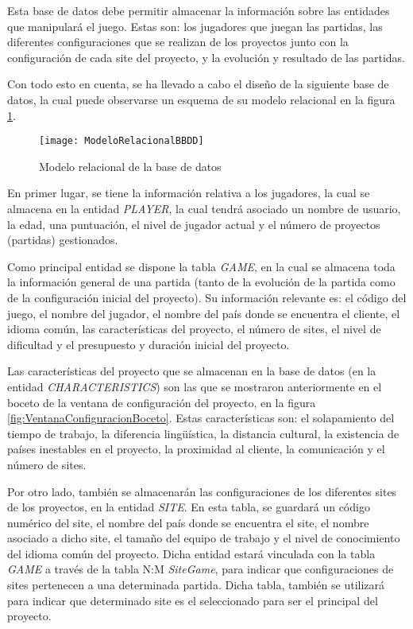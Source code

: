 Esta base de datos debe permitir almacenar la información sobre las entidades que manipulará el juego. Estas son: los jugadores que juegan las partidas, las diferentes configuraciones que se realizan de los proyectos junto con la configuración de cada site del proyecto, y la evolución y resultado de las partidas.

Con todo esto en cuenta, se ha llevado a cabo el diseño de la siguiente base de datos, la cual puede observarse un esquema de su modelo relacional en la figura \ref{fig:ModeloRelacionalBBDD}.

\begin{figure}[htb]
	\centering
	\texttt{[image: ModeloRelacionalBBDD]}
	\caption[Modelo relacional de la base de datos]{Modelo relacional de la base de datos}
	\label{fig:ModeloRelacionalBBDD}
\end{figure}

En primer lugar, se tiene la información relativa a los jugadores, la cual se almacena en la entidad \emph{PLAYER}, la cual tendrá asociado un nombre de usuario, la edad, una puntuación, el nivel de jugador actual y el número de proyectos (partidas) gestionados.

Como principal entidad se dispone la tabla \emph{GAME}, en la cual se almacena toda la información general de una partida (tanto de la evolución de la partida como de la configuración inicial del proyecto). Su información relevante es: el código del juego, el nombre del jugador, el nombre del país donde se encuentra el cliente, el idioma común, las características del proyecto, el número de sites, el nivel de dificultad y el presupuesto y duración inicial del proyecto.

Las características del proyecto que se almacenan en la base de datos (en la entidad \emph{CHARACTERISTICS}) son las que se mostraron anteriormente en el boceto de la ventana de configuración del proyecto, en la figura \ref{fig:VentanaConfiguracionBoceto}. Estas características son: el solapamiento del tiempo de trabajo, la diferencia lingüística, la distancia cultural, la existencia de países inestables en el proyecto, la proximidad al cliente, la comunicación y el número de sites.

Por otro lado, también se almacenarán las configuraciones de los diferentes sites de los proyectos, en la entidad \emph{SITE}. En esta tabla, se guardará un código numérico del site, el nombre del país donde se encuentra el site, el nombre asociado a dicho site, el tamaño del equipo de trabajo y el nivel de conocimiento del idioma común del proyecto. Dicha entidad estará vinculada con la tabla \emph{GAME} a través de la tabla N:M \emph{SiteGame}, para indicar que configuraciones de sites pertenecen a una determinada partida. Dicha tabla, también se utilizará para indicar que determinado site es el seleccionado para ser el principal del proyecto.

